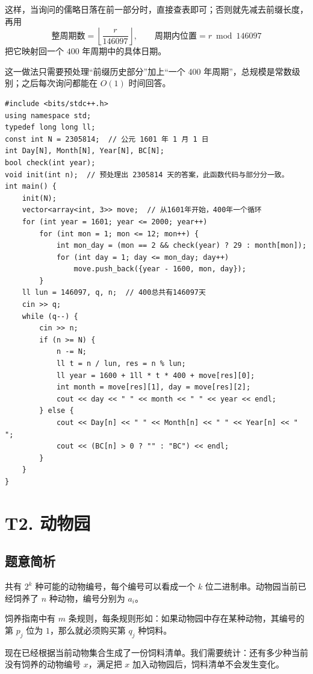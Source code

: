 \documentclass{book}
\begin{document}
这样，当询问的儒略日落在前一部分时，直接查表即可；否则就先减去前缀长度，再用
\[
\text{整周期数}=\left\lfloor \frac{r}{146097}\right\rfloor,\qquad
\text{周期内位置}=r\bmod 146097
\]
把它映射回一个 $400$ 年周期中的具体日期。

这一做法只需要预处理“前缀历史部分”加上“一个 400 年周期”，总规模是常数级别；之后每次询问都能在 $O(1)$ 时间回答。
\newpage
        \begin{lstlisting}[style = code]
#include <bits/stdc++.h>
using namespace std;
typedef long long ll;
const int N = 2305814;  // 公元 1601 年 1 月 1 日
int Day[N], Month[N], Year[N], BC[N];
bool check(int year);
void init(int n);  // 预处理出 2305814 天的答案，此函数代码与部分分一致。
int main() {
    init(N);
    vector<array<int, 3>> move;  // 从1601年开始，400年一个循环
    for (int year = 1601; year <= 2000; year++)
        for (int mon = 1; mon <= 12; mon++) {
            int mon_day = (mon == 2 && check(year) ? 29 : month[mon]);
            for (int day = 1; day <= mon_day; day++)
                move.push_back({year - 1600, mon, day});
        }
    ll lun = 146097, q, n;  // 400总共有146097天
    cin >> q;
    while (q--) {
        cin >> n;
        if (n >= N) {
            n -= N;
            ll t = n / lun, res = n % lun;
            ll year = 1600 + 1ll * t * 400 + move[res][0];
            int month = move[res][1], day = move[res][2];
            cout << day << " " << month << " " << year << endl;
        } else {
            cout << Day[n] << " " << Month[n] << " " << Year[n] << " ";
            cout << (BC[n] > 0 ? "" : "BC") << endl;
        }
    }
}\end{lstlisting}
    \newpage

    \section{T2. 动物园} %
    
    
    \subsection{题意简析}
共有 $2^k$ 种可能的动物编号，每个编号可以看成一个 $k$ 位二进制串。动物园当前已经饲养了 $n$ 种动物，编号分别为 $a_i$。

饲养指南中有 $m$ 条规则，每条规则形如：如果动物园中存在某种动物，其编号的第 $p_j$ 位为 $1$，那么就必须购买第 $q_j$ 种饲料。

现在已经根据当前动物集合生成了一份饲料清单。我们需要统计：还有多少种当前没有饲养的动物编号 $x$，满足把 $x$ 加入动物园后，饲料清单不会发生变化。
\end{document}
